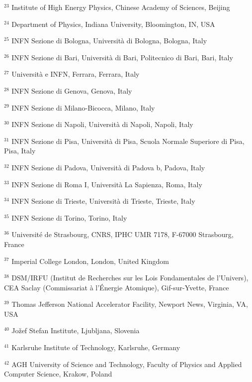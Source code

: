 \par {\footnotesize $^{23}$ Institute of High Energy Physics, Chinese Academy of Sciences, Beijing}
\par {\footnotesize $^{24}$ Department of Physics, Indiana University, Bloomington, IN, USA}
\par {\footnotesize $^{25}$ INFN Sezione di Bologna, Università di Bologna, Bologna, Italy}
\par {\footnotesize $^{26}$ INFN Sezione di Bari, Università di Bari, Politecnico di Bari, Bari, Italy}
\par {\footnotesize $^{27}$ Università e INFN, Ferrara, Ferrara, Italy}
\par {\footnotesize $^{28}$ INFN Sezione di Genova, Genova, Italy}
\par {\footnotesize $^{29}$ INFN Sezione di Milano-Bicocca, Milano, Italy}
\par {\footnotesize $^{30}$ INFN Sezione di Napoli, Università di Napoli, Napoli, Italy}
\par {\footnotesize $^{31}$ INFN Sezione di Pisa, Università di Pisa, Scuola Normale Superiore di Pisa, Pisa, Italy}
\par {\footnotesize $^{32}$ INFN Sezione di Padova, Università di Padova b, Padova, Italy}
\par {\footnotesize $^{33}$ INFN Sezione di Roma I, Università La Sapienza, Roma, Italy}
\par {\footnotesize $^{34}$ INFN Sezione di Trieste, Università di Trieste, Trieste, Italy}
\par {\footnotesize $^{35}$ INFN Sezione di Torino, Torino, Italy}
\par {\footnotesize $^{36}$ Université de Strasbourg, CNRS, IPHC UMR 7178, F-67000 Strasbourg, France}
\par {\footnotesize $^{37}$ Imperial College London, London, United Kingdom}
\par {\footnotesize $^{38}$ DSM/IRFU (Institut de Recherches sur les Lois Fondamentales de l’Univers), CEA Saclay (Commissariat à l’Énergie Atomique), Gif-sur-Yvette, France}
\par {\footnotesize $^{39}$ Thomas Jefferson National Accelerator Facility, Newport News, Virginia, VA, USA}
\par {\footnotesize $^{40}$ Jožef Stefan Institute, Ljubljana, Slovenia}
\par {\footnotesize $^{41}$ Karlsruhe Institute of Technology, Karlsruhe, Germany}
\par {\footnotesize $^{42}$ AGH University of Science and Technology, Faculty of Physics and Applied Computer Science, Krakow, Poland}
